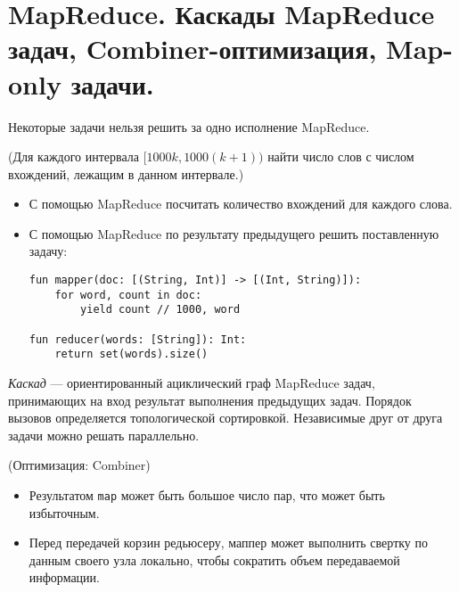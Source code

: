 \section{MapReduce. Каскады MapReduce задач, Combiner-оптимизация, Map-only задачи.}

Некоторые задачи нельзя решить за одно исполнение MapReduce.


\begin{example}(Для каждого интервала $[1000k, 1000(k + 1))$ найти число слов с
  числом вхождений, лежащим в данном интервале.)
  \begin{itemize}
    \item С помощью MapReduce посчитать количество вхождений для каждого слова.
    \item С помощью MapReduce по результату предыдущего решить поставленную
      задачу:
      \begin{lstlisting}
fun mapper(doc: [(String, Int)] -> [(Int, String)]):
    for word, count in doc:
        yield count // 1000, word

fun reducer(words: [String]): Int:
    return set(words).size()
      \end{lstlisting}
  \end{itemize}
\end{example}

\begin{definition}
    \textit{Каскад} --- ориентированный ациклический граф MapReduce задач,
    принимающих на вход результат выполнения предыдущих задач.
    Порядок вызовов определяется топологической сортировкой.
    Независимые друг от друга задачи можно решать параллельно.
\end{definition}

\begin{algorithm}(Оптимизация: Combiner)
    \begin{itemize}
        \item Результатом \texttt{map} может быть большое число пар, что может быть избыточным.
        \item Перед передачей корзин редьюсеру, маппер может выполнить свертку по данным
            своего узла локально, чтобы сократить объем передаваемой информации.
    \end{itemize}
\end{algorithm}

